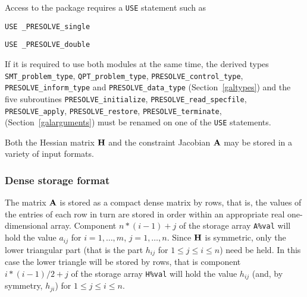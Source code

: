 \documentclass{galahad}
\newcommand{\packagename}{PRESOLVE}
\newcommand{\fullpackagename}{\libraryname\_\packagename}
\begin{document}

\galhowto

Access to the package requires a {\tt USE} statement such as

\medskip{}

\hspace{8mm} {\tt USE \fullpackagename\_single}

\medskip{}

\hspace{8mm} {\tt USE  \fullpackagename\_double}

\medskip

\noindent
If it is required to use both modules at the same time, the derived types 
{\tt SMT\_problem\_type}, 
{\tt QPT\_problem\_type}, 
{\tt \packagename\_control\_type}, 
{\tt \packagename\_inform\_type} 
and
{\tt \packagename\_data\_type}
(Section~\ref{galtypes})
and the five subroutines
{\tt \packagename\_initialize}, 
{\tt \packagename\_read\_specfile}, 
{\tt \packagename\_apply}, 
{\tt \packagename\_restore}, 
{\tt \packagename\_terminate}, 
(Section~\ref{galarguments})
must be renamed on one of the {\tt USE} statements.


\galmatrix

Both the Hessian matrix ${\mathbf{H}}$ and the constraint Jacobian ${\mathbf{A}}$
may be stored in a variety of input formats.

\subsubsection{Dense storage format}\label{dense}
The matrix ${\mathbf{A}}$ is stored as a compact 
dense matrix by rows, that is, the values of the entries of each row in turn are
stored in order within an appropriate real one-dimensional array.
Component $n \ast (i-1) + j$ of the storage array {\tt A\%val} will hold the 
value $a_{ij}$ for $i = 1, \ldots , m$, $j = 1, \ldots , n$.
Since ${\mathbf{H}}$ is symmetric, only the lower triangular part (that is the part 
$h_{ij}$ for $1 \leq j \leq i \leq n$) need be held. In this case
the lower triangle will be stored by rows, that is 
component $i \ast (i-1)/2 + j$ of the storage array {\tt H\%val}  
will hold the value $h_{ij}$ (and, by symmetry, $h_{ji}$)
for $1 \leq j \leq i \leq n$.
\end{document}
